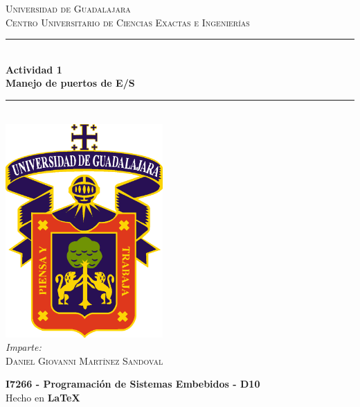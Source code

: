 \documentclass[11pt,letterpaper]{article}
\newcommand{\HRule}{\rule{\linewidth}{0.5mm}} %
\begin{document}

\begin{titlepage}
    \center
    
    \textsc{\LARGE Universidad de Guadalajara}\\[0.2cm] %
    \textsc{Centro Universitario de Ciencias Exactas e Ingenierías}\\[1cm]
    
    \HRule \\[0.3cm]
    { 
        \LARGE \textbf{Actividad 1} \\[0.3cm]
        \large \textbf{Manejo de puertos de E/S} \\[0.3cm]
    }
    \HRule \\[2cm]
    
    \includegraphics[width=6cm]{logo_udg_color.eps}\\[1.25cm] %
    
    \center
    \vspace{1cm}
    \emph{Imparte:} \\ %
    \textsc{Daniel Giovanni Martínez Sandoval} 
    
    \vfill
    \textbf{I7266 - Programación de Sistemas Embebidos - D10} \\
    Hecho en \textbf{\LaTeX}	
\end{titlepage}




\end{document}
